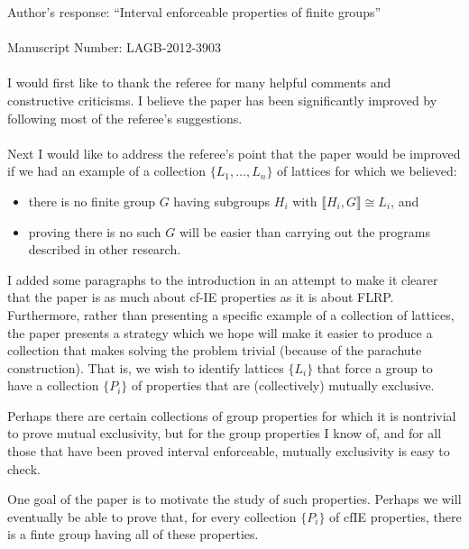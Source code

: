 \documentclass{article}
\newcommand{\lb}{\ensuremath{\llbracket}}
\newcommand{\rb}{\ensuremath{\rrbracket}}
\begin{document}
\noindent Author's response: ``Interval enforceable properties of finite groups''\\
\\
Manuscript Number: LAGB-2012-3903\\
\\
I would first like to thank the referee for many helpful comments and constructive
criticisms.  I believe the paper has been significantly improved by following
most of the referee's suggestions.\\
\\
Next I would like to address the referee's point that the paper would be
improved if we had an example of a collection $\{L_1, \dots, L_n\}$ of
lattices for which we believed:
\begin{itemize}
\item 
 there is no finite group $G$ having subgroups $H_i$ with $\lb H_i, G\rb
\cong L_i$, and 
\item proving there is no such $G$ will be easier than carrying out the programs
  described in other research.
\end{itemize}
I added some paragraphs to the introduction in an attempt to make it clearer 
that the paper is as much about cf-IE properties as it is about FLRP. 
Furthermore, rather than presenting a specific example of a collection of
lattices, the paper presents a strategy which we hope will make it easier to
produce a collection that makes solving the problem trivial (because of the
parachute construction).  That is, we wish to identify lattices $\{L_i\}$ that force a
group to have a collection $\{P_i\}$ of properties that are (collectively)
mutually exclusive.   

Perhaps there are certain collections of group properties for which it is
nontrivial to prove mutual exclusivity, but for the group properties I know of,
and for all those that have been proved interval enforceable, mutually
exclusivity is easy to check. 

One goal of the paper is to motivate the study of such properties.  Perhaps we
will eventually be able to prove that, for every collection $\{P_i\}$ of
\acs{cfIE} properties, there is a finte group having all of these properties.
\end{document}
